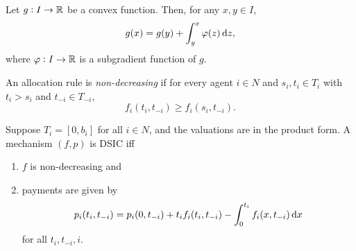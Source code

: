 		\begin{lemma}
			\label{lem: subgrad int}
			Let $g : I \to \mathbb{R}$ be a convex function. Then, for any $x,y \in I$,
			\[ g(x) = g(y) + \int_y^x \varphi(z) \dif z, \]
			where $\varphi:I \to \mathbb{R}$ is a subgradient function of $g$.
		\end{lemma}

		\begin{fdef}
			An allocation rule is \emph{non-decreasing} if for every agent $i \in N$ and $s_i,t_i \in T_i$ with $t_i > s_i$ and $t_{-i} \in T_{-i}$,
			\[ f_i(t_i,t_{-i}) \ge f_i(s_i,t_{-i}). \]
		\end{fdef}

		\begin{ftheo}[Myerson]
			\label{theo: myerson}
			Suppose $T_i = [0,b_i]$ for all $i \in N$, and the valuations are in the product form. A mechanism $(f,p)$ is DSIC iff
			\begin{enumerate}[label=(\alph*)]
				\item $f$ is non-decreasing and
				\item payments are given by
				\[ p_i(t_i,t_{-i}) = p_i(0,t_{-i}) + t_i f_i(t_i,t_{-i}) - \int_0^{t_i} f_i(x,t_{-i}) \dif x \]
				for all $t_i,t_{-i},i$.
			\end{enumerate}
		\end{ftheo}
